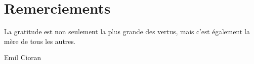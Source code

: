 
\chapter{Remerciements}
\epigraph{La gratitude est non seulement la plus grande des vertus, mais c'est également la mère de tous les autres.}{Emil Cioran}

